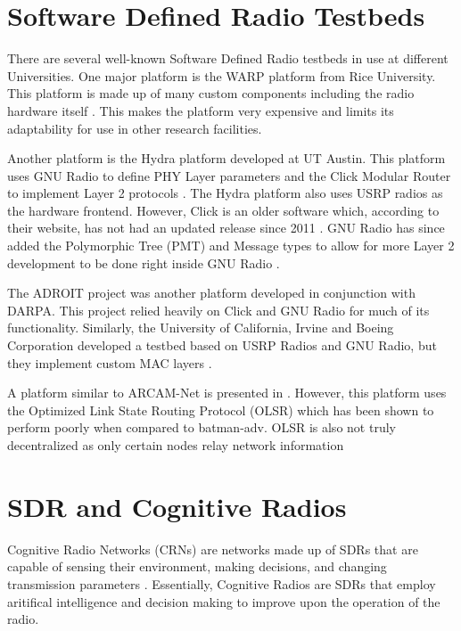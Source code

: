 \section{Software Defined Radio Testbeds}

There are several well-known Software Defined Radio testbeds in use at different Universities. One major platform is the WARP platform from Rice University. This platform is made up of many custom components including the radio hardware itself \cite{7071706}. This makes the platform very expensive and limits its adaptability for use in other research facilities. 

Another platform is the Hydra platform developed at UT Austin. This platform uses GNU Radio to define PHY Layer parameters and the Click Modular Router to implement Layer 2 protocols \cite{4212821}. The Hydra platform also uses USRP radios as the hardware frontend. However, Click is an older software which, according to their website, has not had an updated release since 2011 \cite{0009}. GNU Radio has since added the Polymorphic Tree (PMT) and Message types to allow for more Layer 2 development to be done right inside GNU Radio \cite{0010}. 

The ADROIT project was another platform developed in conjunction with DARPA. This project relied heavily on Click and GNU Radio for much of its functionality. \cite{4286321}  Similarly, the University of California, Irvine and Boeing Corporation developed a testbed based on USRP Radios and GNU Radio, but they implement custom MAC layers \cite{4753441}. 

A platform similar to ARCAM-Net is presented in \cite{0002}. However, this platform uses the Optimized Link State Routing Protocol (OLSR) which has been shown to perform poorly when compared to batman-adv. OLSR is also not truly decentralized as only certain nodes relay network information \cite{5375690}


\section{SDR and Cognitive Radios}

Cognitive Radio Networks (CRNs) are networks made up of SDRs that are capable of sensing their environment, making decisions, and changing transmission parameters \cite{Akyildiz2007921}. Essentially, Cognitive Radios are SDRs that employ aritifical intelligence and decision making to improve upon the operation of the radio. 

